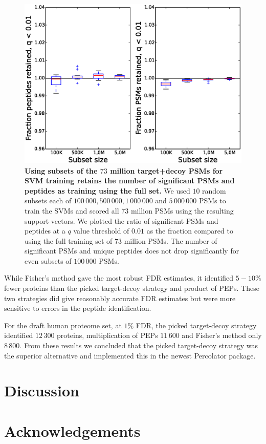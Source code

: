 \documentclass{article}
\begin{document}
\begin{figure}[!htp]
\begin{center}
\includegraphics[width=0.6\linewidth]{./img/subset-performance}
\caption{\label{fig:subset}\textbf{Using subsets of the $73$ million
target+decoy PSMs for SVM training retains the number of significant
PSMs and peptides as training using the full set.} We used
$10$ random subsets each of $100\,000, 500\,000, 1\,000\,000$ and
$5\,000\,000$ PSMs to train the SVMs and scored all $73$ million PSMs
using the resulting support vectors. We plotted the ratio of
significant PSMs and peptides at a $q$ value threshold of $0.01$ as
the fraction compared to using the full training set of $73$ million
PSMs. The number of significant PSMs and unique peptides does not drop
significantly for even subsets of $100\,000$ PSMs.}
\end{center}
\end{figure}



While Fisher’s method gave the most robust FDR estimates, it
identified $5-10\%$ fewer proteins than the picked target-decoy
strategy and product of PEPs. These two strategies did give reasonably
accurate FDR estimates but were more sensitive to errors in the
peptide identification. 


For the draft human proteome set, at $1\%$ FDR, the picked
target-decoy strategy identified $12\,300$ proteins, multiplication of
PEPs $11\,600$ and Fisher’s method only $8\,800$. From these results
we concluded that the picked target-decoy strategy was the superior
alternative and implemented this in the newest Percolator package.


\section*{Discussion}


\section*{Acknowledgements}


{} 

\end{document}
